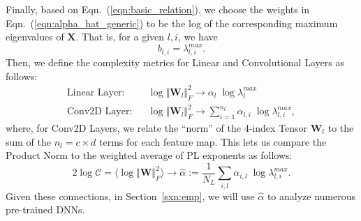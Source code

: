 
Finally, based on Eqn.~(\ref{eqn:basic_relation}), we choose the weights in Eqn.~(\ref{eqn:alpha_hat_generic}) to be the log of the corresponding maximum eigenvalues of $\mathbf{X}$.
That is, for a given $l,i$, we have 
$$
b_{l,i} = \lambda_{l,i}^{max}  .
$$
Then, we define the complexity metrics for Linear and Convolutional Layers as follows:
\begin{eqnarray*}
\text{Linear Layer:} & & \log\Vert\mathbf{W}_{l}\Vert^{2}_{F} 
\rightarrow 
\alpha_{l}\;\log\lambda_{l}^{max}  \\
\text{Conv2D Layer:} & & \log\Vert\mathbf{W}_{l}\Vert^{2}_{F} 
\rightarrow 
\sum_{i=1}^{n_{l}}\alpha_{l,i} \;\log\lambda_{l,i}^{max} , 
\end{eqnarray*}
where, for Conv2D Layers, we relate the ``norm'' of the 4-index Tensor $\mathbf{W}_{l}$ to the sum of the $n_{l}=c\times d$ terms for each feature map.
This lets us compare the Product Norm to the weighted average of PL exponents as follows:
\begin{equation}
2\log\mathcal{C}=\langle\log\Vert\mathbf{W}\Vert^{2}_{F}\rangle 
\rightarrow 
\hat{\alpha} := \dfrac{1}{N_{L}}\sum_{i,l}\alpha_{i,l}\;\log \lambda_{l,i}^{max}  .
\label{eqn:alpha_hat_specific}
\end{equation}
Given these connections, in Section~\ref{sxn:emp}, we will use $\hat{\alpha}$ to analyze numerous pre-trained DNNs.





